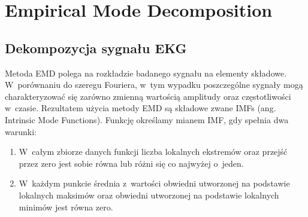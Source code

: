 \section{Empirical Mode Decomposition}

\subsection{Dekompozycja sygnału EKG}
\indent

Metoda EMD polega na rozkładzie badanego sygnału na elementy składowe.
W~porównaniu do szeregu Fouriera, w~tym wypadku poszczególne sygnały mogą
charakteryzować się zarówno zmienną wartością amplitudy oraz częstotliwości
w~czasie. Rezultatem użycia metody EMD są składowe zwane IMFs (ang. Intrinsic
Mode Functions). Funkcję określamy mianem IMF, gdy spełnia dwa warunki:
\begin{enumerate}[1.]
    \item W~całym zbiorze danych funkcji liczba lokalnych ekstremów oraz przejść
    przez zero jest sobie równa lub różni się co najwyżej o~jeden.
    \item W~każdym punkcie średnia z~wartości obwiedni utworzonej na podstawie
    lokalnych maksimów oraz obwiedni utworzonej na podstawie lokalnych minimów
    jest równa zero.
\end{enumerate}

